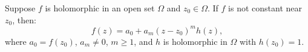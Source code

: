 Suppose $f$ is holomorphic in an open set $\Omega$ and $z_0 \in \Omega$. If $f$ is not constant near $z_0$, then:
\[
f(z) = a_0 + a_m (z - z_0)^m h(z),
\]
where $a_0 = f(z_0)$, $a_m \neq 0$, $m \geq 1$, and $h$ is holomorphic in $\Omega$ with $h(z_0) = 1$.
